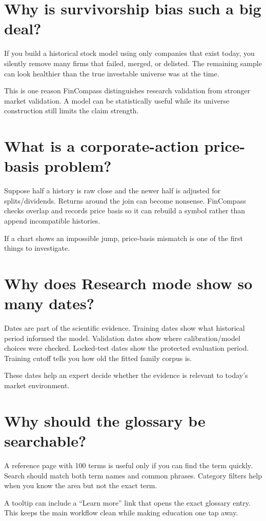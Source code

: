 \documentclass[11pt]{article}
\begin{document}
\section{Why is survivorship bias such a big deal?}
If you build a historical stock model using only companies that exist today, you silently remove many firms that failed, merged, or delisted. The remaining sample can look healthier than the true investable universe was at the time.

This is one reason FinCompass distinguishes research validation from stronger market validation. A model can be statistically useful while its universe construction still limits the claim strength.

\section{What is a corporate-action price-basis problem?}
Suppose half a history is raw close and the newer half is adjusted for splits/dividends. Returns around the join can become nonsense. FinCompass checks overlap and records price basis so it can rebuild a symbol rather than append incompatible histories.

If a chart shows an impossible jump, price-basis mismatch is one of the first things to investigate.

\section{Why does Research mode show so many dates?}
Dates are part of the scientific evidence. Training dates show what historical period informed the model. Validation dates show where calibration/model choices were checked. Locked-test dates show the protected evaluation period. Training cutoff tells you how old the fitted family corpus is.

These dates help an expert decide whether the evidence is relevant to today's market environment.

\section{Why should the glossary be searchable?}
A reference page with 100 terms is useful only if you can find the term quickly. Search should match both term names and common phrases. Category filters help when you know the area but not the exact term.

A tooltip can include a ``Learn more'' link that opens the exact glossary entry. This keeps the main workflow clean while making education one tap away.
\end{document}
